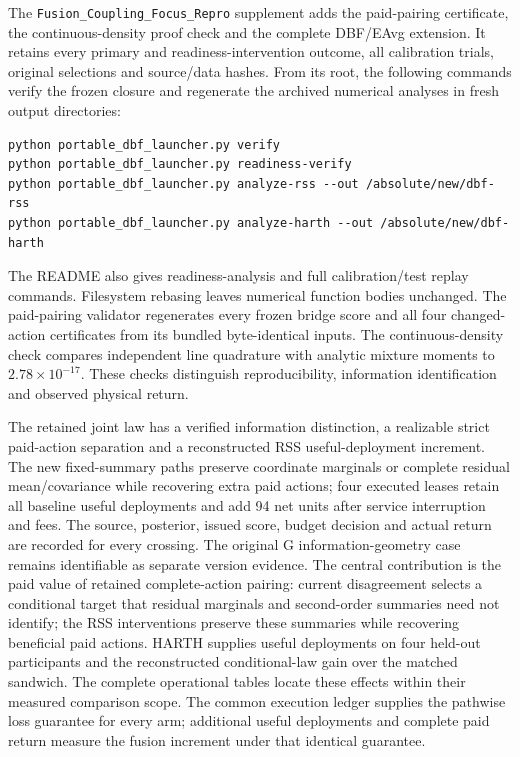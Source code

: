 \documentclass[10pt]{article}
\begin{document}
The \texttt{Fusion\_Coupling\_Focus\_Repro} supplement adds the paid-pairing
certificate, the continuous-density proof check and the complete DBF/EAvg
extension. It retains every primary and readiness-intervention outcome,
all calibration trials, original selections and source/data hashes.
From its root, the following commands verify the frozen closure and
regenerate the archived numerical analyses in fresh output directories:
\begin{verbatim}
python portable_dbf_launcher.py verify
python portable_dbf_launcher.py readiness-verify
python portable_dbf_launcher.py analyze-rss --out /absolute/new/dbf-rss
python portable_dbf_launcher.py analyze-harth --out /absolute/new/dbf-harth
\end{verbatim}
The README also gives readiness-analysis and full calibration/test replay
commands. Filesystem rebasing leaves numerical function bodies unchanged.
The paid-pairing validator regenerates every frozen bridge score and all
four changed-action certificates from its bundled byte-identical inputs.
The continuous-density check compares independent line quadrature with
analytic mixture moments to $2.78\times10^{-17}$. These checks distinguish
reproducibility, information identification and observed physical return.

The retained joint law has a verified information distinction, a realizable
strict paid-action separation and a reconstructed RSS useful-deployment
increment. The new fixed-summary paths preserve coordinate marginals or
complete residual mean/covariance while recovering extra paid actions;
four executed leases retain all baseline useful deployments and add 94 net
units after service interruption and fees. The source, posterior, issued
score, budget decision and actual return are recorded for every crossing.
The original G information-geometry case remains identifiable as separate
version evidence. The central contribution is the paid value of retained
complete-action pairing: current disagreement selects a conditional target
that residual marginals and second-order summaries need not identify;
the RSS interventions preserve these summaries while recovering beneficial
paid actions. HARTH supplies useful deployments on four held-out participants
and the reconstructed conditional-law gain over the matched sandwich.
The complete operational tables locate these effects within their measured
comparison scope. The common execution ledger supplies the pathwise loss
guarantee for every arm; additional useful deployments and complete paid
return measure the fusion increment under that identical guarantee.
\end{document}

